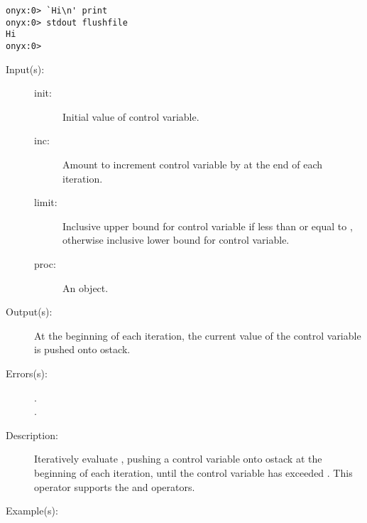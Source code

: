 \begin{description}
\begin{description}
\begin{verbatim}
onyx:0> `Hi\n' print
onyx:0> stdout flushfile
Hi
onyx:0>
		\end{verbatim}
	\end{description}
\label{systemdict:for}
\item[{\onyxop{init inc limit proc}{for}{--}}: ]
	\begin{description}\item[]
	\item[Input(s): ]
		\begin{description}\item[]
		\item[init: ]
			Initial value of control variable.
		\item[inc: ]
			Amount to increment control variable by at the end of
			each iteration.
		\item[limit: ]
			Inclusive upper bound for control variable if less than
			or equal to , otherwise inclusive lower
			bound for control variable.
		\item[proc: ]
			An object.
		\end{description}
	\item[Output(s): ]  At the beginning of each iteration, the current
		value of the control variable is pushed onto ostack.
	\item[Errors(s): ]
		\begin{description}\item[]
		\item[.]
		\item[.]
		\end{description}
	\item[Description: ]
		Iteratively evaluate , pushing a control variable
		onto ostack at the beginning of each iteration, until the
		control variable has exceeded .  This operator
		supports the
		and operators.
	\item[Example(s): ]\begin{verbatim}


\end{verbatim}
\end{description}
\end{description}
